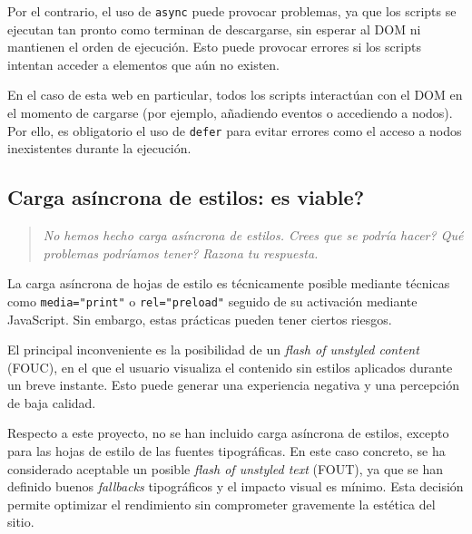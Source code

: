 \documentclass{article}
\begin{document}
Por el contrario, el uso de \texttt{async} puede provocar problemas, ya que los scripts se ejecutan tan pronto como terminan de descargarse, sin esperar al DOM ni mantienen el orden de ejecución. Esto puede provocar errores si los scripts intentan acceder a elementos que aún no existen.

En el caso de esta web en particular, todos los scripts interactúan con el DOM en el momento de cargarse (por ejemplo, añadiendo eventos o accediendo a nodos). Por ello, es obligatorio el uso de \texttt{defer} para evitar errores como el acceso a nodos inexistentes durante la ejecución.

\subsection{Carga asíncrona de estilos: \textquestiondown es viable?}\label{subsec:carga-asincrona-de-estilos}

\begin{quotation}
\textit{No hemos hecho carga asíncrona de estilos. \textquestiondown Crees que se podría hacer? \textquestiondown Qué problemas podríamos tener? Razona tu respuesta.}
\end{quotation}

La carga asíncrona de hojas de estilo es técnicamente posible mediante técnicas como \texttt{media="print"} o \texttt{rel="preload"} seguido de su activación mediante JavaScript. Sin embargo, estas prácticas pueden tener ciertos riesgos.

El principal inconveniente es la posibilidad de un \textit{flash of unstyled content} (FOUC), en el que el usuario visualiza el contenido sin estilos aplicados durante un breve instante. Esto puede generar una experiencia negativa y una percepción de baja calidad.

Respecto a este proyecto, no se han incluido carga asíncrona de estilos, excepto para las hojas de estilo de las fuentes tipográficas. En este caso concreto, se ha considerado aceptable un posible \textit{flash of unstyled text} (FOUT), ya que se han definido buenos \textit{fallbacks} tipográficos y el impacto visual es mínimo. Esta decisión permite optimizar el rendimiento sin comprometer gravemente la estética del sitio.
\end{document}
